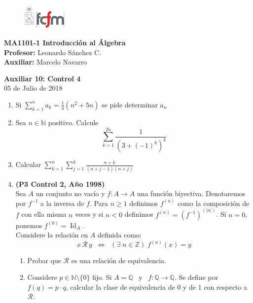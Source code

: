 \documentclass[letterpaper,11pt]{article}
\newcommand{\cur}[1]{\mathcal{#1}}
\newcommand{\id}{\operatorname{Id}}
\newcommand{\Q}{\mathbb Q}
\newcommand{\N}{\mathbb N}
\newcommand{\Z}{\mathbb Z}
\theoremstyle{plain}
\begin{document}
\newpage
\pagestyle{fancy}
\fancyhf{}

\begin{figure} %
    \vspace{-5mm}
    \includegraphics[width=0.2\textwidth]{img/fcfm2.png}
\end{figure}


\noindent
\textbf{MA1101-1 Introducción al Álgebra}\\
\textbf{Profesor: }Leonardo Sánchez C.\\
\textbf{Auxiliar: }Marcelo Navarro

\begin{center}
{\bf \Large Auxiliar 10: Control 4}\\
{05 de Julio de 2018}
\end{center}

\begin{enumerate}[\bf P1.]
    \item Si $\displaystyle \sum_{k=1}^n a_k=\frac{1}{3}(n^2+5n)$ se pide determinar $a_n$
    \item Sea $n\in \N$ positivo. Calcule
        $$\displaystyle \sum_{k=1}^{2n} \frac{1}{(3+(-1)^k)^{k}}  $$
    \item Calcular $\displaystyle \sum_{k=1}^{n}\sum_{j=1}^{k} \frac{n+k}{(n+j-1)(n+j)}$
    \item \textbf{(P3 Control 2, Año 1998)}\\
Sea $A$ un conjunto no vacío y $f:A\longrightarrow A$ una función biyectiva. Denotaremos por $f^{-1}$ a la inversa de $f$. Para $n\geq 1$ definimos $f^{(n)}$ como la composición de $f$ con ella misma $n$ veces y si $n<0$ definimos $f^{(n)}=(f^{-1})^{(|n|)}$. Si $n=0$, ponemos $f^{(0)}=\id_{A}$.\\
Considere la relación en $A$ definida como:
$$x\,\cur{R}\,y \;\; \Longleftrightarrow \;\; (\exists\;n\in\Z)\; f^{(n)}(x)=y$$
\begin{enumerate}
\item Probar que $\cur{R}$ es una relación de equivalencia.
\item Considere $p\in\N\setminus \{0\}$ fijo. Si $A=\Q$ \  y \ $f:\Q\longrightarrow \Q$. Se define por $f(q)=p\cdot q$, calcular la clase de equivalencia de 0 y de 1 con respecto a $\cur{R}$.
\end{enumerate}
\end{enumerate}
\end{document}
